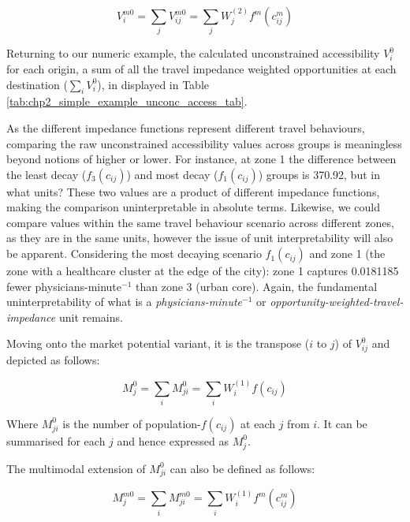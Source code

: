\documentclass[
11pt, %
oneside, %
english, %
singlespacing, %
]{macthesis} %
\begin{document}
\begin{equation}
\label{eq:unconstrained-multimodal-accessibility}
V^{m0}_{i} = \sum_j V^{m0}_{ij} =  \sum_j W_j^{(2)} f^m(c^m_{ij})
\end{equation} 

Returning to our numeric example, the calculated unconstrained accessibility \(V^0_{i}\) for each origin, a sum of all the travel impedance weighted opportunities at each destination (\(\sum_i V^0_{i}\)), in displayed in Table \ref{tab:chp2_simple_example_unconc_access_tab}.



As the different impedance functions represent different travel behaviours, comparing the raw unconstrained accessibility values across groups is meaningless beyond notions of higher or lower. For instance, at zone 1 the difference between the least decay (\(f_3(c_{ij})\)) and most decay (\(f_1(c_{ij})\)) groups is 370.92, but in what units? These two values are a product of different impedance functions, making the comparison uninterpretable in absolute terms. Likewise, we could compare values within the same travel behaviour scenario across different zones, as they are in the same units, however the issue of unit interpretability will also be apparent. Considering the most decaying scenario \(f_1(c_{ij})\) and zone 1 (the zone with a healthcare cluster at the edge of the city): zone 1 captures 0.0181185 fewer physicians-minute\(^{-1}\) than zone 3 (urban core). Again, the fundamental uninterpretability of what is a \emph{physicians-minute\(^{-1}\)} or \emph{opportunity-weighted-travel-impedance} unit remains.

Moving onto the market potential variant, it is the transpose (\(i\) to \(j\)) of \(V^0_{ij}\) and depicted as follows:

\begin{equation}
\label{eq:unconstrained-market}
M_j^0 = \sum_i M^0_{ji} = \sum_i W_i^{(1)} f(c_{ij})
\end{equation} 

Where \(M^0_{ji}\) is the number of population-\(f(c_{ij})\) at each \(j\) from \(i\). It can be summarised for each \(j\) and hence expressed as \(M^0_j\).

The multimodal extension of \(M^0_{ji}\) can also be defined as follows:

\begin{equation}
\label{eq:unconstrained-multimodal-accessibility}
M^{m0}_{j} = \sum_i M^{m0}_{ji} =  \sum_i W_i^{(1)} f^m(c^m_{ij})
\end{equation} 
\end{document}
